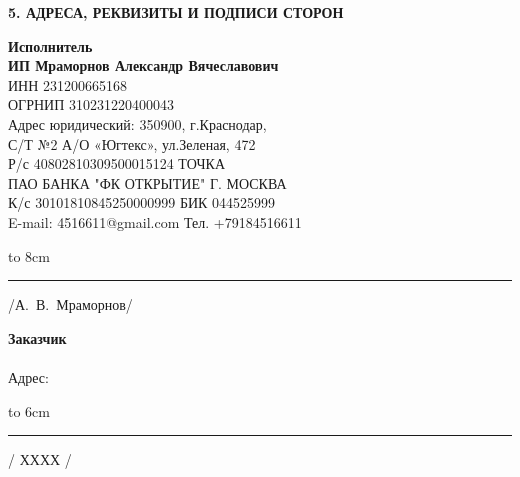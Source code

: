 \documentclass[a4paper,12pt,english,notitlepage]{report}
\begin{document}
\begin{center}
	\textbf{5. АДРЕСА, РЕКВИЗИТЫ И ПОДПИСИ СТОРОН}
\end{center}

\noindent\parbox[l][5cm]{8cm}
{\begin{flushleft}
\small\textbf{Исполнитель\\ ИП Мраморнов Александр Вячеславович\\} 
\footnotesize {ИНН 231200665168\\
ОГРНИП 310231220400043}\\
\footnotesize{Адрес юридический: 350900, г.Краснодар,\\
С/Т №2 А/О «Югтекс», ул.Зеленая, 472\\
Р/с 40802810309500015124   ТОЧКА\\
ПАО БАНКА "ФК ОТКРЫТИЕ" Г. МОСКВА\\
К/с 30101810845250000999 БИК   044525999\\
E-mail: 4516611@gmail.com  Тел. +79184516611 }
   	\end{flushleft}
   \vspace{5mm}
  
\hbox to 8cm{\rule{40mm}{0.1mm} /А.~В.~Мраморнов/}}\hfill\parbox[l][5cm]{8cm}
{
\begin{flushleft}
	\small\textbf{Заказчик\\ \\} 
	Адрес:\\
\end{flushleft}
\vspace{28mm}
\hbox to 6cm{\rule{40mm}{0.1mm} / ХХХХ /   }}
                                       
                                       
\end{document}
